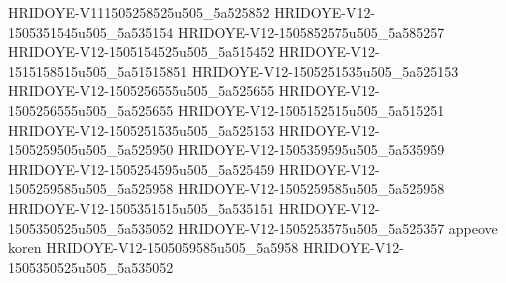 HRIDOYE-V111505258525u505_5a525852
HRIDOYE-V12-1505351545u505_5a535154
HRIDOYE-V12-1505852575u505_5a585257 
HRIDOYE-V12-1505154525u505_5a515452
HRIDOYE-V12-1515158515u505_5a51515851
HRIDOYE-V12-1505251535u505_5a525153
HRIDOYE-V12-1505256555u505_5a525655
HRIDOYE-V12-1505256555u505_5a525655
HRIDOYE-V12-1505152515u505_5a515251
HRIDOYE-V12-1505251535u505_5a525153
HRIDOYE-V12-1505259505u505_5a525950
HRIDOYE-V12-1505359595u505_5a535959
HRIDOYE-V12-1505254595u505_5a525459
HRIDOYE-V12-1505259585u505_5a525958
HRIDOYE-V12-1505259585u505_5a525958
HRIDOYE-V12-1505351515u505_5a535151
HRIDOYE-V12-1505350525u505_5a535052
HRIDOYE-V12-1505253575u505_5a525357
appeove koren
HRIDOYE-V12-1505059585u505_5a5958
HRIDOYE-V12-1505350525u505_5a535052
